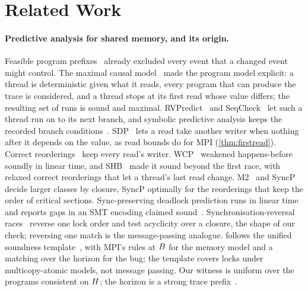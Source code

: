 \section{Related Work}
\label{sec:related}

\paragraph{Predictive analysis for shared memory, and its origin.} Feasible program
prefixes~\citep{netzer91accuracy} already excluded every event that a changed event might
control. The maximal causal model~\citep{serbanuta12mcm} made the program model explicit: a
thread is deterministic given what it reads, every program that can produce the trace is
considered, and a thread stops at its first read whose value differs; the resulting set of
runs is sound and maximal. RVPredict~\citep{huang14rvpredict} and
SeqCheck~\citep{cai21seqcheck} let such a thread run on to its next branch, and symbolic
predictive analysis keeps the recorded branch conditions~\citep{wang09ctp}. SDP~\citep{genc19sdp}
lets a read take another writer when nothing after it depends on the value, as read bounds do
for MPI (\cref{thm:firstread}). Correct
reorderings~\citep{smaragdakis12cp} keep every read's writer. WCP~\citep{kini17wcp} weakened
happens-before soundly in linear time, and SHB~\citep{mathur18shb} made it sound beyond the
first race, with relaxed correct reorderings that let a thread's last read change. M2~\citep{pavlogiannis20m2} and
SyncP~\citep{mathur21syncp} decide larger classes by closure, SyncP optimally for the
reorderings that keep the order of critical sections. Sync-preserving deadlock
prediction runs in linear time~\citep{tunc23spd} and reports gaps in an SMT encoding claimed
sound~\citep{kalhauge18sound}. Synchronisation-reversal races~\citep{shi24osr} reverse one lock
order and test acyclicity over a closure, the shape of our check; reversing one match is the
message-passing analogue.  follows the unified soundness
template~\citep{liu25soundness}, with MPI's rules at $B$ for the memory model and a matching
over the horizon for the bug; the template covers locks under multicopy-atomic models, not
message passing. Our witness is uniform over the programs consistent on $H$; the horizon is a
strong trace prefix~\citep{ang24strong}.

